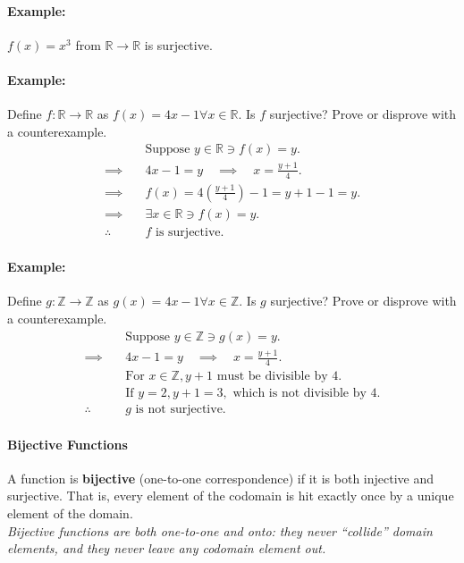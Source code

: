 \paragraph*{Example:} $f(x) = x^3$ from $\mathbb{R} \to \mathbb{R}$ is surjective.

\paragraph*{Example:} Define $f: \mathbb{R} \to \mathbb{R}$ as $f(x) = 4x-1 \forall x \in \mathbb{R}$. Is $f$ surjective? Prove or disprove with a counterexample.\\
\begin{align*}
    &\text{Suppose } y \in \mathbb{R} \ni f(x) = y.\\
    \implies \quad & 4x - 1 = y \quad \implies \quad x = \frac{y + 1}{4}.\\
    \implies \quad & f(x) = 4(\frac{y + 1}{4}) - 1 = y + 1 - 1 = y.\\
    \implies \quad & \exists x \in \mathbb{R} \ni f(x) = y.\\
    \therefore \quad & f \text{ is surjective.}
\end{align*}

\paragraph*{Example:} Define $g: \mathbb{Z} \to \mathbb{Z}$ as $g(x) = 4x - 1 \forall x \in \mathbb{Z}$. Is $g$ surjective? Prove or disprove with a counterexample.\\
\begin{align*}
    &\text{Suppose } y \in \mathbb{Z} \ni g(x) = y.\\
    \implies \quad & 4x - 1 = y \quad \implies \quad x = \frac{y + 1}{4}.\\
    &\text{For } x \in \mathbb{Z}, y + 1 \text{ must be divisible by } 4.\\
    &\text{If } y = 2, y + 1 = 3, \text{ which is not divisible by } 4.\\
    \therefore \quad & g \text{ is not surjective.}
\end{align*}

\paragraph*{Bijective Functions}
A function is \textbf{bijective} (one-to-one correspondence) if it is both injective and surjective. That is, every element of the codomain is hit exactly once by a unique element of the domain.\\
\textit{Bijective functions are both one-to-one and onto: they never ``collide'' domain elements, and they never leave any codomain element out.}

